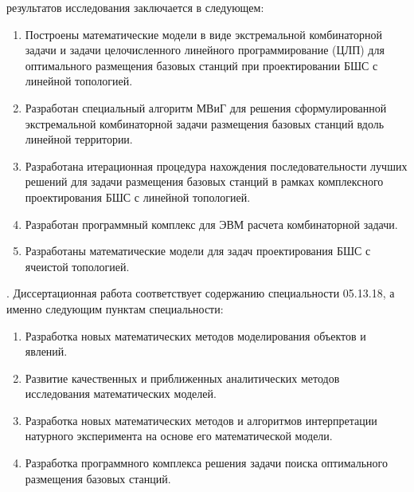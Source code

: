 {\novelty} результатов исследования заключается в следующем:
\begin{enumerate}[beginpenalty=10000] %
  \item Построены математические модели в виде экстремальной комбинаторной задачи и задачи целочисленного линейного программирование (ЦЛП) для оптимального размещения базовых станций при проектировании БШС с линейной топологией.  
  \item Разработан специальный алгоритм МВиГ для решения сформулированной экстремальной комбинаторной задачи размещения базовых станций вдоль линейной территории.
  \item Разработана итерационная процедура нахождения последовательности лучших решений для задачи размещения базовых станций в рамках комплексного проектирования БШС с линейной топологией.
  \item Разработан программный комплекс для ЭВМ расчета комбинаторной задачи.
  \item Разработаны математические модели для задач проектирования БШС с ячеистой топологией.
\end{enumerate}

{\fieldresearch}. Диссертационная работа соответствует содержанию специальности 05.13.18, а именно следующим пунктам специальности:
\begin{enumerate}
    \item Разработка новых математических методов моделирования объектов и явлений.
    \item Развитие качественных и приближенных аналитических методов исследования математических моделей.
    \item Разработка новых математических методов и алгоритмов интерпретации натурного эксперимента на основе его математической модели.
    \item Разработка программного комплекса решения задачи поиска оптимального размещения базовых станций.
\end{enumerate}

